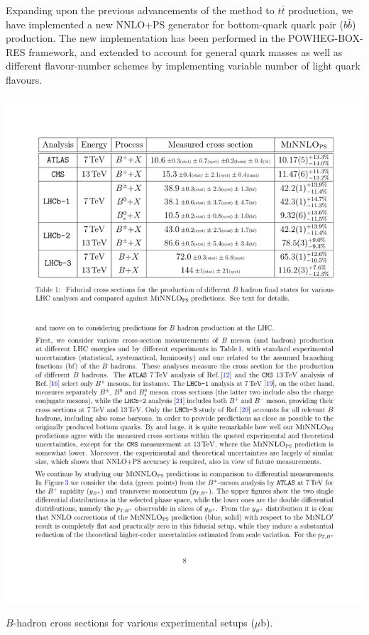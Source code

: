 \documentclass{FBR_Bericht_2025}
\begin{document}
\begin{refsection}
Expanding upon the previous advancements of the \minnlo{} method to $t \bar t$ production, 
we have implemented a new NNLO+PS generator for bottom-quark quark pair ($b\bar b$) production.
The new implementation has been performed in the POWHEG-BOX-RES framework, and extended to account for 
general quark masses as well as different flavour-number schemes by implementing
variable number of light quark flavours.

\begin{table}[tbh]
\begin{center}
\includegraphics[width=1\linewidth]{plots/bb_table.pdf}
\caption{$B$-hadron cross sections for various experimental setups ($\mu$b).}
\label{tab:bb}
\end{center}
\end{table}


\end{refsection}
\end{document}

